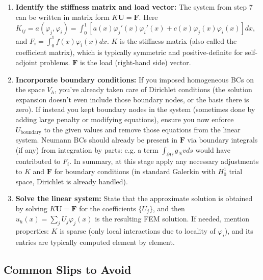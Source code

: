 \documentclass[a4paper,11pt]{article}
\begin{document}
\begin{enumerate}
    \item \textbf{Identify the stiffness matrix and load vector:} The system from step 7 can be written in matrix form $K \mathbf{U} = \mathbf{F}$. Here $K_{ij} = a(\varphi_j,\varphi_i) = \int_0^1 [a(x)\varphi_j'(x)\varphi_i'(x) + c(x)\varphi_j(x)\varphi_i(x)] dx$, and $F_i = \int_0^1 f(x) \varphi_i(x) dx$. $K$ is the stiffness matrix (also called the coefficient matrix), which is typically symmetric and positive-definite for self-adjoint problems. $\mathbf{F}$ is the load (right-hand side) vector.

    \item \textbf{Incorporate boundary conditions:} If you imposed homogeneous BCs on the space $V_h$, you've already taken care of Dirichlet conditions (the solution expansion doesn't even include those boundary nodes, or the basis there is zero). If instead you kept boundary nodes in the system (sometimes done by adding large penalty or modifying equations), ensure you now enforce $U_{\text{boundary}}$ to the given values and remove those equations from the linear system. Neumann BCs should already be present in $\mathbf{F}$ via boundary integrals (if any) from integration by parts: e.g. a term $\int_{\partial \Omega} g_N v ds$ would have contributed to $F_i$. In summary, at this stage apply any necessary adjustments to $K$ and $\mathbf{F}$ for boundary conditions (in standard Galerkin with $H_0^1$ trial space, Dirichlet is already handled).

    \item \textbf{Solve the linear system:} State that the approximate solution is obtained by solving $K \mathbf{U} = \mathbf{F}$ for the coefficients $\{U_j\}$, and then $u_h(x) = \sum_j U_j \varphi_j(x)$ is the resulting FEM solution. If needed, mention properties: $K$ is sparse (only local interactions due to locality of $\varphi_i$), and its entries are typically computed element by element.
\end{enumerate}

\subsection{Common Slips to Avoid}
\end{document}
